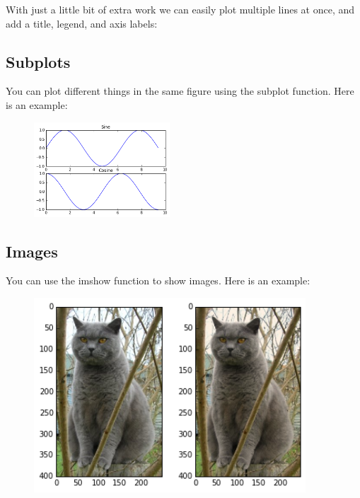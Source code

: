 \documentclass[10pt,a4paper]{article}
\begin{document}
With just a little bit of extra work we can easily plot multiple lines at once, and add a title, legend, and axis labels:


\subsection{Subplots}

You can plot different things in the same figure using the subplot function. Here is an example:


\begin{figure}[htbp]
        \centering
        \includegraphics[width=2in]{images/sine_cosine_subplot.png}
\end{figure}


\subsection{Images}

You can use the imshow function to show images. Here is an example:


\begin{figure}[htbp]
        \centering
        \includegraphics[width=4in]{images/cat_tinted_imshow.png}
\end{figure}
\end{document}
